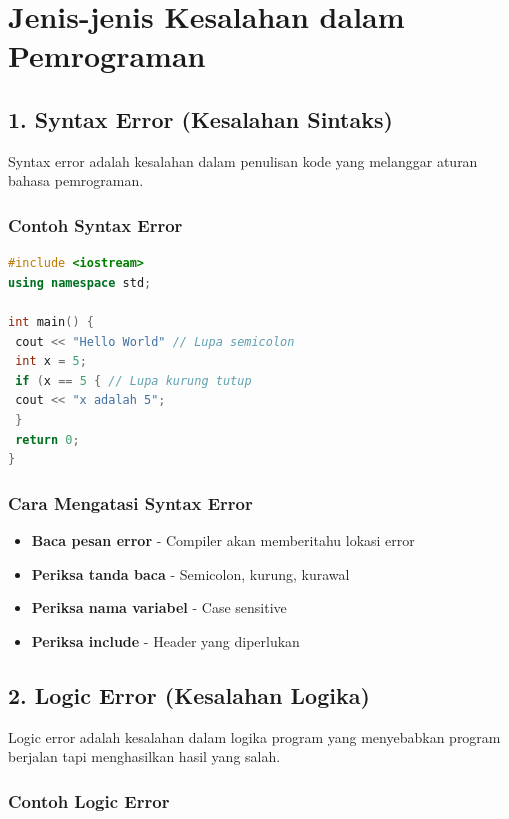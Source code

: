 \section{Jenis-jenis Kesalahan dalam Pemrograman}

\subsection{1. Syntax Error (Kesalahan Sintaks)}

Syntax error adalah kesalahan dalam penulisan kode yang melanggar aturan bahasa pemrograman.

\subsubsection{Contoh Syntax Error}

\begin{lstlisting}[language=c++, caption=Contoh Syntax Error]
#include <iostream>
using namespace std;

int main() {
 cout << "Hello World" // Lupa semicolon
 int x = 5;
 if (x == 5 { // Lupa kurung tutup
 cout << "x adalah 5";
 }
 return 0;
}
\end{lstlisting}

\subsubsection{Cara Mengatasi Syntax Error}

\begin{itemize}
\item \textbf{Baca pesan error} - Compiler akan memberitahu lokasi error
\item \textbf{Periksa tanda baca} - Semicolon, kurung, kurawal
\item \textbf{Periksa nama variabel} - Case sensitive
\item \textbf{Periksa include} - Header yang diperlukan
\end{itemize}

\subsection{2. Logic Error (Kesalahan Logika)}

Logic error adalah kesalahan dalam logika program yang menyebabkan program berjalan tapi menghasilkan hasil yang salah.

\subsubsection{Contoh Logic Error}

